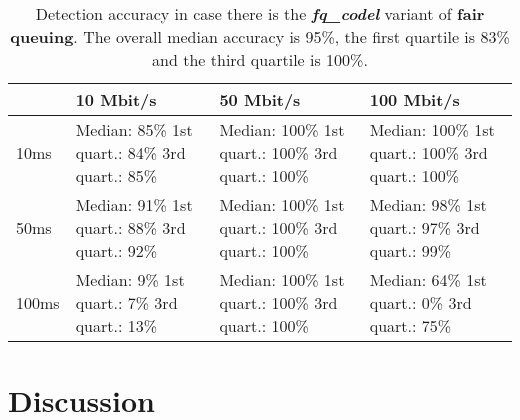 \documentclass[conference]{IEEEtran}
\begin{document}
\begin{table}
\begin{tabularx}{\columnwidth}{| l | X | X | X |}
\hline
& 10 Mbit/s & 50 Mbit/s & 100 Mbit/s \\ \hline
10ms & Median: 85\% \newline 1st quart.: 84\% \newline 3rd quart.: 85\% & Median: 100\% \newline 1st quart.: 100\% \newline 3rd quart.: 100\% & Median: 100\% \newline 1st quart.: 100\% \newline 3rd quart.: 100\%\\ \hline
50ms & Median: 91\% \newline 1st quart.: 88\% \newline 3rd quart.: 92\% & Median: 100\% \newline 1st quart.: 100\% \newline 3rd quart.: 100\% & Median: 98\% \newline 1st quart.: 97\% \newline 3rd quart.: 99\% \\ \hline
100ms & Median: 9\% \newline 1st quart.: 7\% \newline 3rd quart.: 13\% & Median: 100\% \newline 1st quart.: 100\% \newline 3rd quart.: 100\% & Median: 64\% \newline 1st quart.: 0\% \newline 3rd quart.: 75\% \\ \hline
\end{tabularx}
\caption{Detection accuracy in case there is the \textbf{\textit{fq\_codel}} variant of \textbf{fair queuing}. The overall median accuracy is 95\%, the first quartile is 83\% and the third quartile is 100\%.}
\label{table:fq_codel}
\end{table}        

\section{Discussion}



\end{document}
